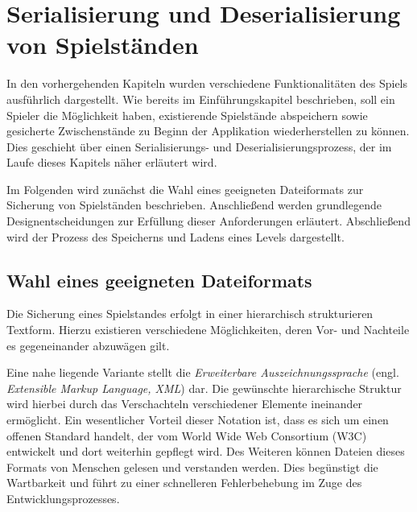 \section{Serialisierung und Deserialisierung von Spielständen}
\label{sec:designSerialization}

In den vorhergehenden Kapiteln wurden verschiedene Funktionalitäten des Spiels ausführlich dargestellt. Wie bereits im Einführungskapitel beschrieben, soll ein Spieler die Möglichkeit haben, existierende Spielstände abspeichern sowie gesicherte Zwischenstände zu Beginn der Applikation wiederherstellen zu können. Dies geschieht über einen Serialisierungs- und Deserialisierungsprozess, der im Laufe dieses Kapitels näher erläutert wird. 


Im Folgenden wird zunächst die Wahl eines geeigneten Dateiformats zur Sicherung von Spiel\-stän\-den beschrieben. Anschließend werden grundlegende Designentscheidungen zur Erfüllung dieser Anforderungen erläutert. Abschließend wird der Prozess des Speicherns und Ladens eines Levels dargestellt. 

\subsection{Wahl eines geeigneten Dateiformats}


Die Sicherung eines Spielstandes erfolgt in einer hierarchisch strukturieren Textform. Hierzu existieren verschiedene Möglichkeiten, deren Vor- und Nachteile es gegeneinander abzuwägen gilt. 

Eine nahe liegende Variante stellt die \textit{Erweiterbare Auszeichnungssprache} (engl. \textit{Extensible Markup Language, XML}) dar. Die gewünschte hierarchische Struktur wird hierbei durch das Verschachteln verschiedener Elemente ineinander ermöglicht. Ein wesentlicher Vorteil dieser Notation ist, dass es sich um einen offenen Standard handelt, der vom World Wide Web Consortium (W3C) entwickelt und dort weiterhin gepflegt wird. Des Weiteren können Dateien dieses Formats von Menschen gelesen und verstanden werden. Dies begünstigt die Wartbarkeit und führt zu einer schnelleren Fehlerbehebung im Zuge des Entwicklungsprozesses. 


